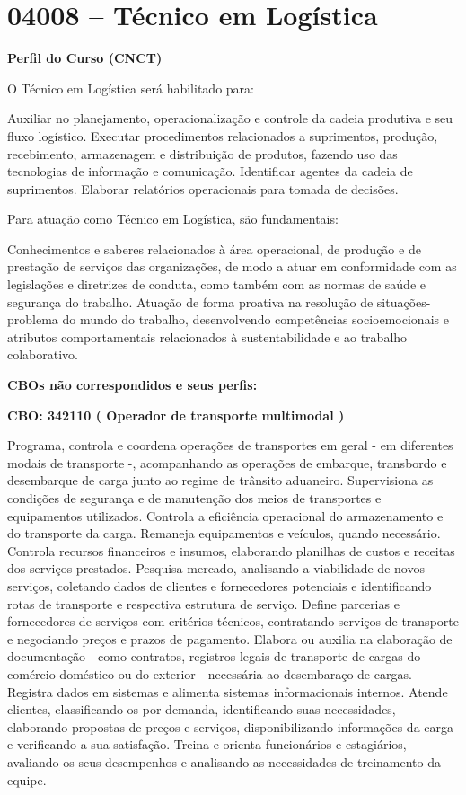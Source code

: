 \documentclass[
]{article}
\begin{document}
\newpage
\section{ 04008 -- Técnico em Logística }

\textbf{Perfil do Curso (CNCT)}

O Técnico em Logística será habilitado para:

Auxiliar no planejamento, operacionalização e controle da cadeia
produtiva e seu fluxo logístico. Executar procedimentos relacionados a
suprimentos, produção, recebimento, armazenagem e distribuição de
produtos, fazendo uso das tecnologias de informação e comunicação.
Identificar agentes da cadeia de suprimentos. Elaborar relatórios
operacionais para tomada de decisões.

Para atuação como Técnico em Logística, são fundamentais:

Conhecimentos e saberes relacionados à área operacional, de produção e
de prestação de serviços das organizações, de modo a atuar em
conformidade com as legislações e diretrizes de conduta, como também com
as normas de saúde e segurança do trabalho. Atuação de forma proativa na
resolução de situações-problema do mundo do trabalho, desenvolvendo
competências socioemocionais e atributos comportamentais relacionados à
sustentabilidade e ao trabalho colaborativo.

\textbf{CBOs não correspondidos e seus perfis:}

\textbf{CBO: 342110  ( Operador de transporte multimodal )}

Programa, controla e coordena operações de transportes em geral - em
diferentes modais de transporte -, acompanhando as operações de
embarque, transbordo e desembarque de carga junto ao regime de trânsito
aduaneiro. Supervisiona as condições de segurança e de manutenção dos
meios de transportes e equipamentos utilizados. Controla a eficiência
operacional do armazenamento e do transporte da carga. Remaneja
equipamentos e veículos, quando necessário. Controla recursos
financeiros e insumos, elaborando planilhas de custos e receitas dos
serviços prestados. Pesquisa mercado, analisando a viabilidade de novos
serviços, coletando dados de clientes e fornecedores potenciais e
identificando rotas de transporte e respectiva estrutura de serviço.
Define parcerias e fornecedores de serviços com critérios técnicos,
contratando serviços de transporte e negociando preços e prazos de
pagamento. Elabora ou auxilia na elaboração de documentação - como
contratos, registros legais de transporte de cargas do comércio
doméstico ou do exterior - necessária ao desembaraço de cargas. Registra
dados em sistemas e alimenta sistemas informacionais internos. Atende
clientes, classificando-os por demanda, identificando suas necessidades,
elaborando propostas de preços e serviços, disponibilizando informações
da carga e verificando a sua satisfação. Treina e orienta funcionários e
estagiários, avaliando os seus desempenhos e analisando as necessidades
de treinamento da equipe.
\end{document}
